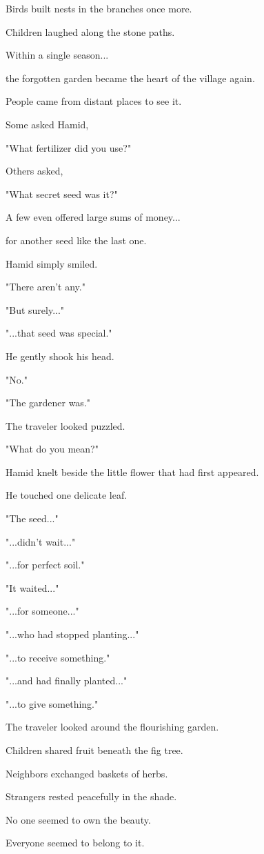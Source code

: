 \documentclass[12pt,openany]{book}
\begin{document}
Birds built nests in the branches once more.

Children laughed along the stone paths.

Within a single season...

the forgotten garden became the heart of the village again.

People came from distant places to see it.

Some asked Hamid,

"What fertilizer did you use?"

Others asked,

"What secret seed was it?"

A few even offered large sums of money...

for another seed like the last one.

Hamid simply smiled.

"There aren't any."

"But surely..."

"...that seed was special."

He gently shook his head.

"No."

"The gardener was."

The traveler looked puzzled.

"What do you mean?"

Hamid knelt beside the little flower that had first appeared.

He touched one delicate leaf.

"The seed..."

"...didn't wait..."

"...for perfect soil."

"It waited..."

"...for someone..."

"...who had stopped planting..."

"...to receive something."

"...and had finally planted..."

"...to give something."

The traveler looked around the flourishing garden.

Children shared fruit beneath the fig tree.

Neighbors exchanged baskets of herbs.

Strangers rested peacefully in the shade.

No one seemed to own the beauty.

Everyone seemed to belong to it.
\end{document}

